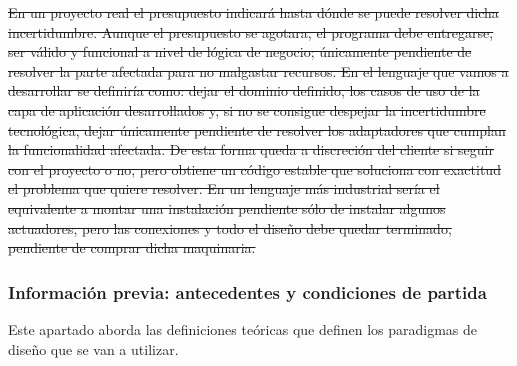 \sout{En un proyecto real el presupuesto indicará hasta dónde se puede resolver dicha incertidumbre.
Aunque el presupuesto se agotara, el programa debe entregarse, ser válido y funcional a nivel de lógica de negocio;
únicamente pendiente de resolver la parte afectada para no malgastar recursos.
En el lenguaje que vamos a desarrollar se definiría como: dejar el dominio definido, los casos de uso de la capa de aplicación desarrollados y, si no se consigue despejar la incertidumbre tecnológica, dejar únicamente pendiente de resolver los adaptadores que cumplan la funcionalidad afectada.
De esta forma queda a discreción del cliente si seguir con el proyecto o no, pero obtiene un código estable que soluciona con exactitud el problema que quiere resolver.
En un lenguaje más industrial sería el equivalente a montar una instalación pendiente sólo de instalar algunos actuadores, pero las conexiones y todo el diseño debe quedar terminado, pendiente de comprar dicha maquinaria.}

\subsubsection{Información previa: antecedentes y condiciones de partida}

Este apartado aborda las definiciones teóricas que definen los paradigmas de diseño que se van a utilizar.

